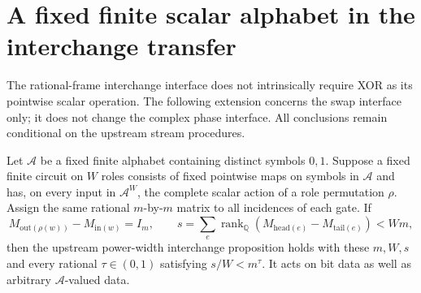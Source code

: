\section{A fixed finite scalar alphabet in the interchange transfer}
\label{sec:finite-alphabet-transfer}

The rational-frame interchange interface does not intrinsically require
XOR as its pointwise scalar operation. The following extension concerns
the swap interface only; it does not change the complex phase interface.
All conclusions remain conditional on the upstream stream procedures.

\begin{proposition}
Let $\mathcal A$ be a fixed finite alphabet containing distinct symbols
$0,1$. Suppose a fixed finite circuit on $W$ roles consists of fixed
pointwise maps on symbols in $\mathcal A$ and has, on every input in
$\mathcal A^W$, the complete scalar action of a role permutation $\rho$.
Assign the same rational $m$-by-$m$ matrix to all incidences of each gate.
If
\[
 M_{\mathrm{out}(\rho(w))}-M_{\mathrm{in}(w)}=I_m,
 \qquad s=\sum_e\operatorname{rank}_{\mathbb Q}
 (M_{\mathrm{head}(e)}-M_{\mathrm{tail}(e)})<Wm,
\]
then the upstream power-width interchange proposition holds with these
$m,W,s$ and every rational $\tau\in(0,1)$ satisfying $s/W<m^\tau$.
It acts on bit data as well as arbitrary $\mathcal A$-valued data.
\end{proposition}

